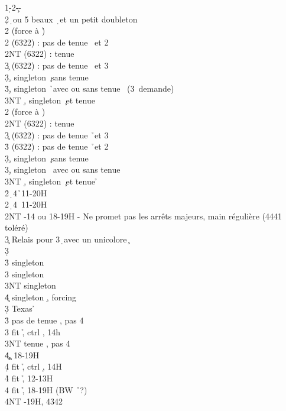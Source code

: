 \documentclass[a4paper]{article}
\begin{document}
\begin{bidtable}
1\d-2\c--\\
2\d {}\d\ ou 5 beaux \d\ et un petit doubleton\+\\
2\h \> (force à \h )\+\\
2\s {} (6322) : pas de tenue \s\ et 2\c \\
2NT  (6322) : tenue \s \\
3\c {} (6322) : pas de tenue \s\ et 3\c \\
3\d {}\d , singleton \c\ sans tenue \s \\
3\h {}\d , singleton \h\ avec ou sans tenue \s\ (3\s\ demande)\\
3NT \d , singleton \c\ et tenue \s \-\\
2\s \> (force à \s )\+\\
2NT  (6322) : tenue \h \\
3\c {} (6322) : pas de tenue \h\ et 3\c \\
3\h {} (6322) : pas de tenue \h\ et 2\c \\
3\d {}\d , singleton \c\ sans tenue \h \\
3\s {}\d , singleton \s\ avec ou sans tenue \h \\
3NT \d , singleton \c\ et tenue \h \-\-\\
2\h {}\d\ 4\h\ 11-20H\\
2\s {}\d\ 4\s\ 11-20H\\
2NT -14 ou 18-19H - Ne promet pas les arrêts majeurs, main régulière (4441 toléré)\+\\
3\c \> Relais pour 3\d\ avec un unicolore \c \+\\
3\d\+\\
3\h \> singleton \s \\
3\s \> singleton \h \\
3NT \> singleton \d \\
4\c \> singleton \d , forcing\-\-\\
3\d \> Texas \h \+\\
3\h \> pas de tenue \s , pas 4\h \\
3\s \> fit \h , ctrl \s , 14h\\
3NT \> tenue \s , pas 4\h \\
4\c {}\c , 18-19H\\
4\d \> fit \h , ctrl \d , 14H\\
4\h \> fit \h , 12-13H\\
4\s \> fit \h , 18-19H (BW \h\ ?)\\
4NT -19H, 4342\-\\

\end{bidtable}
\end{document}
